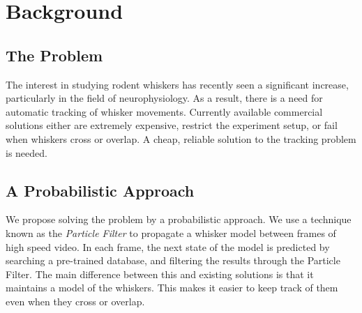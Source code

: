 \section*{Background}
\subsection*{The Problem}
The interest in studying rodent whiskers has recently seen a significant increase, particularly in the field of neurophysiology. As a result, there is a need for automatic tracking of whisker movements. Currently available commercial solutions either are extremely expensive, restrict the experiment setup, or fail when whiskers cross or overlap. A cheap, reliable solution to the tracking problem is needed.

\subsection*{A Probabilistic Approach}
We propose solving the problem by a probabilistic approach. We use a technique known as the \emph{Particle Filter} to propagate a whisker model between frames of high speed video. In each frame, the next state of the model is predicted by searching a pre-trained database, and filtering the results through the Particle Filter. The main difference between this and existing solutions is that it maintains a model of the whiskers. This makes it easier to keep track of them even when they cross or overlap.

